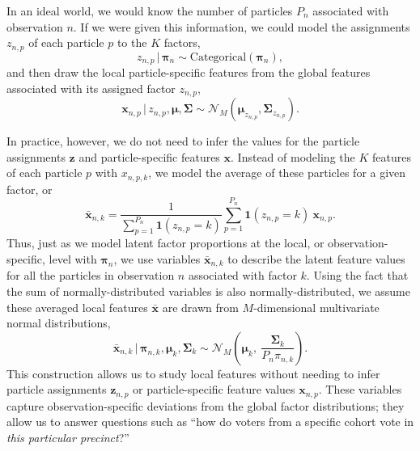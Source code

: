 \documentclass[twoside,11pt]{article}
\newcommand{\g}{\, | \,}
\begin{document}
In an ideal world, we would know the number of particles $P_n$ associated with observation $n$.  If we were given this information, we could model the assignments $z_{n,p}$ of each particle $p$ to the $K$ factors,
\begin{equation}z_{n,p} \g \boldsymbol{\pi}_n \sim \mbox{Categorical}\left(\boldsymbol{\pi}_n\right), \label{eq:parametric_x_assignment}\end{equation}
and then draw the local particle-specific features from the global features associated with its assigned factor $z_{n,p}$,
\begin{equation}
\boldsymbol{x}_{n,p} \g z_{n,p}, \boldsymbol{\mu}, \boldsymbol{\Sigma} \sim \mathcal{N}_{M}(\boldsymbol{\mu}_{z_{n,p}}, \boldsymbol{\Sigma}_{z_{n,p}}).
\label{eq:parametric_x_value}
\end{equation}

In practice, however, we do not need to infer the values for the particle assignments $\boldsymbol{z}$ and particle-specific features $\boldsymbol{x}$.  Instead of modeling the $K$ features of each particle $p$ with $x_{n,p,k}$, we model the average of these particles for a given factor, or 
\begin{equation}
\boldsymbol{\bar{x}}_{n,k} = \frac{1}{\sum_{p=1}^{P_n}\mathbf{1}(z_{n,p}=k)} \sum_{p=1}^{P_n}\mathbf{1}(z_{n,p}=k)~\boldsymbol{x}_{n,p}.
\label{eq:parametric_x_ave}
\end{equation}
Thus, just as we model latent factor proportions at the local, or observation-specific, level with $\boldsymbol{\pi}_n$, we use variables $\boldsymbol{\bar{x}}_{n,k}$ to describe the latent feature values for   all the particles in observation $n$ associated with factor $k$. Using the fact that the sum of normally-distributed variables is also normally-distributed, we assume these averaged local features $\boldsymbol{\bar{x}}$ are drawn from $M$-dimensional multivariate normal distributions,
\begin{equation}
\boldsymbol{\bar{x}}_{n,k} \g \boldsymbol{\pi}_{n,k}, \boldsymbol{\mu}_{k}, \boldsymbol{\Sigma}_{k} \sim \mathcal{N}_M \left(\boldsymbol{\mu}_k,~ \frac{\boldsymbol{\Sigma}_k}{P_n \pi_{n,k}}\right).
\label{eq:parametric_x}
\end{equation}
This construction allows us to study local features without needing to infer particle assignments $\boldsymbol{z}_{n,p}$ or particle-specific feature values $\boldsymbol{x}_{n,p}$. These variables capture observation-specific deviations from the global factor distributions; they allow us to answer questions such as ``how do voters from a specific cohort vote in \emph{this particular precinct}?''
\end{document}
